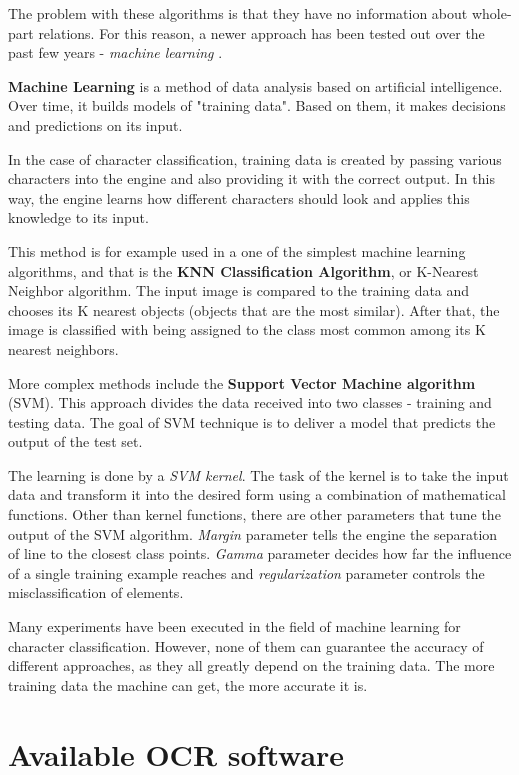 The problem with these algorithms is that they have no information about whole-part relations. For this reason, a newer approach has been tested out over the past few years - \emph{machine learning} \citep{characterClassification}.

\textbf{Machine Learning} is a method of data analysis based on artificial intelligence. Over time, it builds models of "training data". Based on them, it makes decisions and predictions on its input. 

In the case of character classification, training data is created by passing various characters into the engine and also providing it with the correct output. In this way, the engine learns how different characters should look and applies this knowledge to its input.

This method is for example used in a one of the simplest machine learning algorithms, and that is the \textbf{KNN Classification Algorithm}, or K-Nearest Neighbor algorithm. The input image is compared to the training data and chooses its K nearest objects (objects that are the most similar). After that, the image is classified with being assigned to the class most common among its K nearest neighbors.

More complex methods include the \textbf{Support Vector Machine algorithm} (SVM). This approach divides the data received into two classes - training and testing data. The goal of SVM technique is to deliver a model that predicts the output of the test set.

The learning is done by a \emph{SVM kernel}. The task of the kernel is to take the input data and transform it into the desired form using a combination of mathematical functions. Other than kernel functions, there are other parameters that tune the output of the SVM algorithm. \emph{Margin} parameter tells the engine the separation of line to the closest class points. \emph{Gamma} parameter decides how far the influence of a single training example reaches and \emph{regularization} parameter controls the misclassification of elements.

Many experiments have been executed in the field of machine learning for character classification. However, none of them can guarantee the accuracy of different approaches, as they all greatly depend on the training data. The more training data the machine can get, the more accurate it is. 

\section{Available OCR software}

